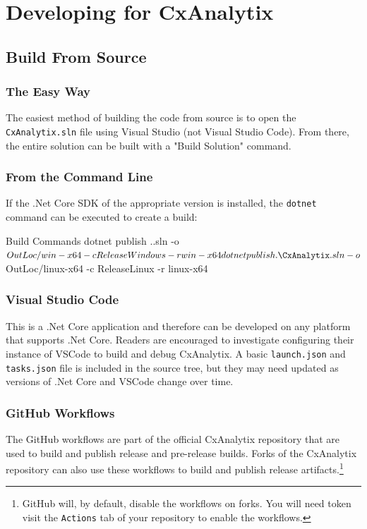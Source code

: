 \chapter{Developing for CxAnalytix}

\section{Build From Source}

\subsection{The Easy Way}
The easiest method of building the code from source is to open the \texttt{CxAnalytix.sln} file using Visual Studio (not Visual Studio Code).
From there, the entire solution can be built with a "Build Solution" command.

\subsection{From the Command Line}
If the .Net Core SDK of the appropriate version is installed, the \texttt{dotnet} command can be executed to create a build:\\

\begin{code}{Build Commands}{}{}
dotnet publish .\CxAnalytix.sln -o $OutLoc/win-x64 -c ReleaseWindows -r win-x64
dotnet publish .\CxAnalytix.sln -o $OutLoc/linux-x64 -c ReleaseLinux -r linux-x64
\end{code}

\subsection{Visual Studio Code}
This is a .Net Core application and therefore can be developed on any platform that supports .Net Core.  Readers are encouraged to investigate configuring
their instance of VSCode to build and debug CxAnalytix.  A basic \texttt{launch.json} and \texttt{tasks.json} file is included in the source tree, but they may need
updated as versions of .Net Core and VSCode change over time.


\subsection{GitHub Workflows}

The GitHub workflows are part of the official CxAnalytix repository that are used to build and publish release and pre-release builds.  Forks of the CxAnalytix
repository can also use these workflows to build and publish release artifacts.\footnote{GitHub will, by default, disable the workflows on forks.  You will need token
visit the \texttt{Actions} tab of your repository to enable the workflows.}

